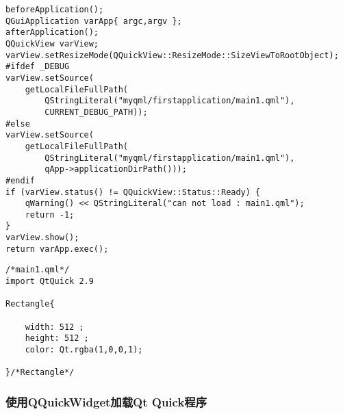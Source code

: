 \begin{lstlisting}[label=f000020,
caption=GoodLuck,
title=\lstlistingname\ \thelstlisting
,firstnumber=67]
beforeApplication();
QGuiApplication varApp{ argc,argv };
afterApplication();
QQuickView varView;
varView.setResizeMode(QQuickView::ResizeMode::SizeViewToRootObject);
#ifdef _DEBUG
varView.setSource(
    getLocalFileFullPath(
        QStringLiteral("myqml/firstapplication/main1.qml"),
        CURRENT_DEBUG_PATH));
#else
varView.setSource(
    getLocalFileFullPath(
        QStringLiteral("myqml/firstapplication/main1.qml"),
        qApp->applicationDirPath()));
#endif
if (varView.status() != QQuickView::Status::Ready) {
    qWarning() << QStringLiteral("can not load : main1.qml");
    return -1;
}
varView.show();
return varApp.exec();
\end{lstlisting}          %
\begin{lstlisting}[label=f000023,
caption=GoodLuck,
title=\lstlistingname\ \thelstlisting
]
/*main1.qml*/
import QtQuick 2.9

Rectangle{

    width: 512 ;
    height: 512 ;
    color: Qt.rgba(1,0,0,1);

}/*Rectangle*/
\end{lstlisting}          %

\FloatBarrier
\subsubsection{
使用QQuickWidget加载Qt Quick程序
}\label{ss001110}

